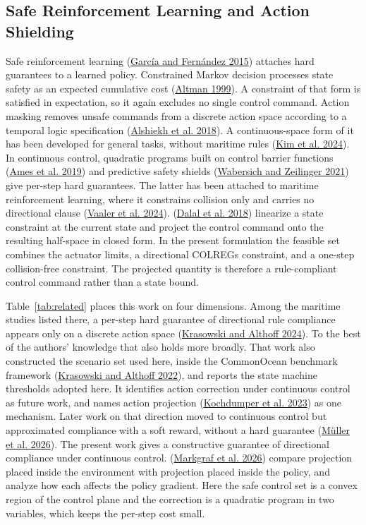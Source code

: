 \documentclass[10pt,letterpaper]{article}
\newcommand{\citl}[2]{(\hyperlink{ref:#1}{#2})}
\begin{document}
\subsection{Safe Reinforcement Learning and Action Shielding}

Safe reinforcement learning \citl{garca2015}{Garc\'ia and Fern\'andez 2015} attaches
hard guarantees to a learned policy. Constrained Markov decision processes state safety as an expected cumulative cost
\citl{altman1999}{Altman 1999}. A constraint of that form is satisfied in expectation,
so it again excludes no single control command. Action
masking removes unsafe commands from a discrete action space according to a temporal logic
specification \citl{alshiekh2018}{Alshiekh et al. 2018}. A continuous-space form of it has been developed for general tasks, without maritime
rules \citl{kim2024}{Kim et al. 2024}. In continuous control, quadratic programs built on control
barrier functions \citl{ames2019}{Ames et al. 2019} and predictive safety shields
\citl{wabersich2021}{Wabersich and Zeilinger 2021} give per-step hard guarantees. The latter
has been attached to maritime reinforcement learning, where it constrains collision only and
carries no directional clause \citl{vaaler2024}{Vaaler et al. 2024}. \citl{dalal2018}{Dalal et al. 2018} linearize a state constraint at the current state
and project the control command onto the resulting half-space in closed form. In the
present formulation the feasible set combines the actuator limits, a directional COLREGs
constraint, and a one-step collision-free constraint. The projected quantity is
therefore a rule-compliant control command rather than a state bound.

Table~\ref{tab:related} places this work on four dimensions. Among the maritime studies listed there, a per-step hard guarantee of directional rule
compliance appears only on a discrete action space \citl{krasowski2024}{Krasowski and
Althoff 2024}. To the best of the authors' knowledge that also holds more broadly. That work also constructed the
scenario set used here, inside the CommonOcean benchmark framework
\citl{krasowski2022}{Krasowski and Althoff 2022}, and reports the state machine
thresholds adopted here. It identifies action correction under continuous control as
future work, and names action projection \citl{kochdumper2023}{Kochdumper et al. 2023}
as one mechanism. Later work on that direction moved to
continuous control but approximated compliance with a soft reward, without a hard guarantee
\citl{mller2026}{M\"uller et al. 2026}. The present work gives a constructive guarantee of
directional compliance under continuous control. \citl{markgraf2026}{Markgraf et al. 2026} compare projection placed inside the
environment with projection placed inside the policy, and analyze how each affects the
policy gradient. Here the safe control set is a convex region of the control plane and
the correction is a quadratic program in two variables, which keeps the per-step cost
small.
\end{document}
